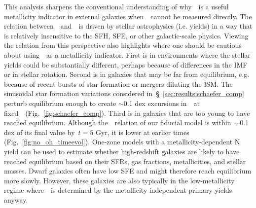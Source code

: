 \documentclass[ms.tex]{subfiles}
\begin{document}
\par
This analysis sharpens the conventional understanding of why~\no~is a useful
metallicity indicator in external galaxies when~\oh~cannot be measured directly.
The relation between~\no~and~\oh~is driven by stellar astrophysics (i.e. yields)
in a way that is relatively insensitive to the SFH, SFE, or other
galactic-scale physics.
Viewing the relation from this perspective also highlights where one should be
cautious about using~\no~as a metallicity indicator.
First is in environments where the stellar yields could be substantially
different, perhaps because of differences in the IMF or in stellar rotation.
Second is in galaxies that may be far from equilibrium, e.g. because of recent
bursts of star formation or mergers diluting the ISM.
The sinusoidal star formation variations considered
in~\S~\ref{sec:results:schaefer_comp} perturb equilibrium enough to create
$\sim$0.1 dex excursions in~\no~at fixed~\oh~(Fig.~\ref{fig:schaefer_comp}).
Third is in galaxies that are too young to have reached equilibrium.
Although the~\ohno~relation of our fiducial model is within~$\sim$0.1 dex of
its final value by~$t = 5$ Gyr, it is lower at earlier times
(Fig.~\ref{fig:no_oh_timeevol}).
One-zone models with a metallicity-dependent N yield can be used to estimate
whether high-redshift galaxies are likely to have reached equilibrium based
on their SFRs, gas fractions, metallicities, and stellar masses.
Dwarf galaxies often have low SFE and might therefore reach equilibrium more
slowly.
However, these galaxies are also typically in the low-metallicity regime
where~\no~is determined by the metallicity-independent primary yields anyway.
\end{document}
